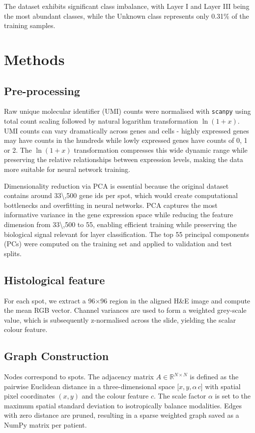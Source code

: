 \documentclass[conference]{IEEEtran}
\begin{document}
The dataset exhibits significant class imbalance, with Layer I and Layer III 
being the most abundant classes, while the Unknown class represents only 0.31\% 
of the training samples.

\section{Methods}
\subsection{Pre-processing}
Raw unique molecular identifier (UMI) counts were normalised with \texttt{scanpy} 
using total count scaling followed by natural logarithm transformation 
\(\ln(1+x)\). UMI counts can vary dramatically across genes and cells - highly 
expressed genes may have counts in the hundreds while lowly expressed genes have 
counts of 0, 1 or 2. The \(\ln(1+x)\) transformation compresses this wide 
dynamic range while preserving the relative relationships between expression 
levels, making the data more suitable for neural network training.

Dimensionality reduction via PCA is essential because the original dataset 
contains around \num{33\,500} gene ids per spot, which would create computational 
bottlenecks and overfitting in neural networks. PCA captures the most 
informative variance in the gene expression space while reducing the feature 
dimension from \num{33\,500}  to 55, enabling efficient training while preserving 
the biological signal relevant for layer classification. The top 55 principal 
components (PCs) were computed on the training set and applied to validation and 
test splits.

\subsection{Histological feature}
For each spot, we extract a 96\(\times\)96 region in the aligned H\&E image and 
compute the mean RGB vector. Channel variances are used to form a weighted 
grey-scale value, which is subsequently z-normalised across the slide, yielding 
the scalar colour feature.

\subsection{Graph Construction}
Nodes correspond to spots. The adjacency matrix \(A \in \mathbb{R}^{N\times N}\) 
is defined as the pairwise Euclidean distance in a three-dimensional space 
\(\bigl[x, y, \alpha\, c\bigr]\) with spatial pixel coordinates \((x,y)\) and 
the colour feature \(c\). The scale factor \(\alpha\) is set to the maximum 
spatial standard deviation to isotropically balance modalities. Edges with zero 
distance are pruned, resulting in a sparse weighted graph saved as a NumPy 
matrix per patient.
\end{document}
